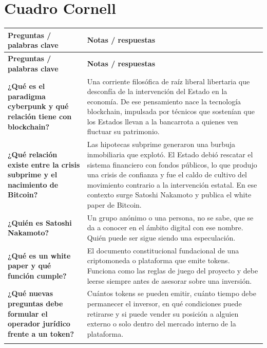 \documentclass[12pt,oneside]{book}
\newlength{\cornellizq}
\newlength{\cornellder}
\begin{document}
\section{Cuadro Cornell}

\begin{longtable}{
    >{\raggedright\arraybackslash}p{\cornellizq}
    >{\raggedright\arraybackslash}p{\cornellder}
}
\toprule
\textbf{Preguntas / palabras clave} & \textbf{Notas / respuestas} \\
\midrule
\endfirsthead
\toprule
\textbf{Preguntas / palabras clave} & \textbf{Notas / respuestas} \\
\midrule
\endhead

\textbf{¿Qué es el paradigma cyberpunk y qué relación tiene con blockchain?} &
Una corriente filosófica de raíz liberal libertaria que desconfía de la intervención del Estado en la economía. De ese pensamiento nace la tecnología blockchain, impulsada por técnicos que sostenían que los Estados llevan a la bancarrota a quienes ven fluctuar su patrimonio. \\
\addlinespace[0.6em]
\midrule[\lightrulewidth]

\textbf{¿Qué relación existe entre la crisis subprime y el nacimiento de Bitcoin?} &
Las hipotecas subprime generaron una burbuja inmobiliaria que explotó. El Estado debió rescatar el sistema financiero con fondos públicos, lo que produjo una crisis de confianza y fue el caldo de cultivo del movimiento contrario a la intervención estatal. En ese contexto surge Satoshi Nakamoto y publica el white paper de Bitcoin. \\
\addlinespace[0.6em]
\midrule[\lightrulewidth]

\textbf{¿Quién es Satoshi Nakamoto?} &
Un grupo anónimo o una persona, no se sabe, que se da a conocer en el ámbito digital con ese nombre. Quién puede ser sigue siendo una especulación. \\
\addlinespace[0.6em]
\midrule[\lightrulewidth]

\textbf{¿Qué es un white paper y qué función cumple?} &
El documento constitucional fundacional de una criptomoneda o plataforma que emite tokens. Funciona como las reglas de juego del proyecto y debe leerse siempre antes de asesorar sobre una inversión. \\
\addlinespace[0.6em]
\midrule[\lightrulewidth]

\textbf{¿Qué nuevas preguntas debe formular el operador jurídico frente a un token?} &
Cuántos tokens se pueden emitir, cuánto tiempo debe permanecer el inversor, en qué condiciones puede retirarse y si puede vender su posición a alguien externo o solo dentro del mercado interno de la plataforma. \\
\addlinespace[0.6em]
\midrule[\lightrulewidth]


\end{longtable}
\end{document}
